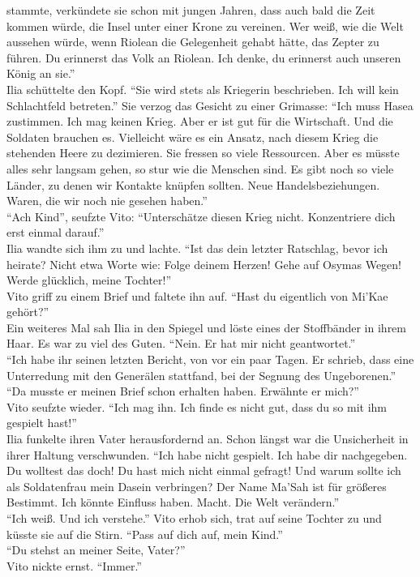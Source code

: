 stammte, verkündete sie schon mit jungen Jahren, dass auch bald die Zeit kommen würde, die Insel 
unter einer Krone zu vereinen. Wer weiß, wie die Welt aussehen würde, wenn Riolean die Gelegenheit 
gehabt hätte, das Zepter zu führen. Du erinnerst das Volk an Riolean. Ich denke, du erinnerst auch 
unseren König an sie.''\\
Ilia schüttelte den Kopf. ``Sie wird stets als Kriegerin beschrieben. Ich will kein Schlachtfeld 
betreten.'' Sie verzog das Gesicht zu einer Grimasse: ``Ich muss Hasea zustimmen. Ich mag keinen 
Krieg. Aber er ist gut für die Wirtschaft. Und die Soldaten brauchen es. Vielleicht wäre es ein 
Ansatz, nach diesem Krieg die stehenden Heere zu dezimieren. Sie fressen so viele Ressourcen. Aber 
es müsste alles sehr langsam gehen, so stur wie die Menschen sind. Es gibt noch so viele Länder, zu 
denen wir Kontakte knüpfen sollten. Neue Handelsbeziehungen. Waren, die wir noch nie gesehen 
haben.''\\
``Ach Kind'', seufzte Vito: ``Unterschätze diesen Krieg nicht. Konzentriere dich erst einmal 
darauf.''\\
Ilia wandte sich ihm zu und lachte. ``Ist das dein letzter Ratschlag, bevor ich heirate? Nicht 
etwa Worte wie: Folge deinem Herzen! Gehe auf Osymas Wegen! Werde glücklich, meine Tochter!''\\
Vito griff zu einem Brief und faltete ihn auf. ``Hast du eigentlich von Mi'Kae gehört?''\\
Ein weiteres Mal sah Ilia in den Spiegel und löste eines der Stoffbänder in ihrem Haar. 
Es war zu viel des Guten. ``Nein. Er hat mir nicht geantwortet.''\\
``Ich habe ihr seinen letzten Bericht, von vor ein paar Tagen. Er schrieb, dass eine 
Unterredung mit den Generälen stattfand, bei der Segnung des Ungeborenen.''\\
``Da musste er meinen Brief schon erhalten haben. Erwähnte er mich?''\\
Vito seufzte wieder. ``Ich mag ihn. Ich finde es nicht gut, dass du so mit ihm gespielt hast!''\\
Ilia funkelte ihren Vater herausfordernd an. Schon längst war die Unsicherheit in ihrer Haltung 
verschwunden. ``Ich habe nicht gespielt. Ich habe dir nachgegeben. Du wolltest das doch! Du hast 
mich nicht einmal gefragt! Und warum sollte ich als Soldatenfrau mein Dasein verbringen? Der 
Name Ma'Sah ist für größeres Bestimmt. Ich könnte Einfluss haben. Macht. Die Welt verändern.''\\
``Ich weiß. Und ich verstehe.'' Vito erhob sich, trat auf seine Tochter zu und küsste sie auf die 
Stirn. ``Pass auf dich auf, mein Kind.''\\
``Du stehst an meiner Seite, Vater?''\\
Vito nickte ernst. ``Immer.''\\


